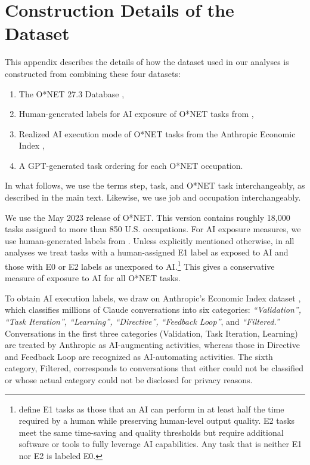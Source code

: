 \section{Construction Details of the Dataset}
\label{app:data_prep}

\renewcommand{\thetable}{F.\arabic{table}}
\renewcommand{\thefigure}{F.\arabic{figure}}
\setcounter{table}{0}
\setcounter{figure}{0}

This appendix describes the details of how the dataset used in our analyses is constructed from combining these four datasets:
\begin{enumerate}
    \item The O*NET 27.3 Database \citep{onet27_3},
    \item Human-generated labels for AI exposure of O*NET tasks from \cite{eloundou2023gpts},
    \item Realized AI execution mode of O*NET tasks from the Anthropic Economic Index \citep{handa2025economictasksperformedai},
    \item A GPT-generated task ordering for each O*NET occupation.
\end{enumerate}
In what follows, we use the terms step, task, and O*NET task interchangeably, as described in the main text.  
Likewise, we use job and occupation interchangeably.  

We use the May 2023 release of O*NET. 
This version contains roughly 18{,}000 tasks assigned to more than 850 U.S. occupations.
For AI exposure measures, we use human-generated labels from \cite{eloundou2023gpts}.
Unless explicitly mentioned otherwise, in all analyses we treat tasks with a human-assigned E1 label as exposed to AI and those with E0 or E2 labels as unexposed to AI.\footnote{
\cite{eloundou2023gpts} define E1 tasks as those that an AI can perform in at least half the time required by a human while preserving human-level output quality.
E2 tasks meet the same time-saving and quality thresholds but require additional software or tools to fully leverage AI capabilities.
Any task that is neither E1 nor E2 is labeled E0.
}
This gives a conservative measure of exposure to AI for all O*NET tasks.

To obtain AI execution labels, we draw on Anthropic's Economic Index dataset \citep{handa2025economictasksperformedai}, which classifies millions of Claude conversations into six categories: \textit{``Validation'', ``Task Iteration'', ``Learning'', ``Directive'', ``Feedback Loop''}, and \textit{``Filtered.''}
Conversations in the first three categories (Validation, Task Iteration, Learning) are treated by Anthropic as AI-augmenting activities, whereas those in Directive and Feedback Loop are recognized as AI-automating activities.
The sixth category, Filtered, corresponds to conversations that either could not be classified or whose actual category could not be disclosed for privacy reasons.

